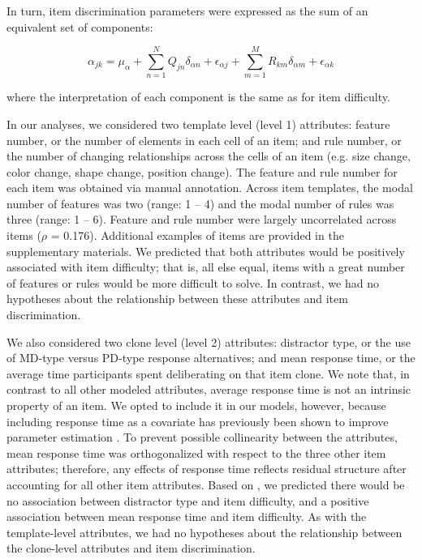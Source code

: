 \documentclass[a4paper,man,natbib]{apa6}
\begin{document}
\noindent In turn, item discrimination parameters were expressed as the sum of an equivalent set of components:

\begin{equation}
\alpha_{jk} = \mu_\alpha + \sum_{n=1}^N Q_{jn} \delta_{\alpha n} + \epsilon_{\alpha j} + \sum_{m=1}^M R_{km} \delta_{\alpha m} + \epsilon_{\alpha k}
\end{equation}

\noindent where the interpretation of each component is the same as for item difficulty.

In our analyses, we considered two template level (level 1) attributes: feature number, or the number of elements in each cell of an item; and rule number, or the number of changing relationships across the cells of an item (e.g. size change, color change, shape change, position change). The feature and rule number for each item was obtained via manual annotation. Across item templates, the modal number of features was two (range: 1 -- 4) and the modal number of rules was three (range: 1 -- 6). Feature and rule number were largely uncorrelated across items ($\rho$ = 0.176). Additional examples of items are provided in the supplementary materials. We predicted that both attributes would be positively associated with item difficulty; that is, all else equal, items with a great number of features or rules would be more difficult to solve. In contrast, we had no hypotheses about the relationship between these attributes and item discrimination. 

We also considered two clone level (level 2) attributes: distractor type, or the use of MD-type versus PD-type response alternatives; and mean response time, or the average time participants spent deliberating on that item clone. We note that, in contrast to all other modeled attributes, average response time is not an intrinsic property of an item. We opted to include it in our models, however, because including response time as a covariate has previously been shown to improve parameter estimation \citep{bertling2018using}. To prevent possible collinearity between the attributes, mean response time was orthogonalized with respect to the three other item attributes; therefore, any effects of response time reflects residual structure after accounting for all other item attributes. Based on \cite{chierchia2019matrix}, we predicted there would be no association between distractor type and item difficulty, and a positive association between mean response time and item difficulty. As with the template-level attributes, we had no hypotheses about the relationship between the clone-level attributes and item discrimination. 
\end{document}
